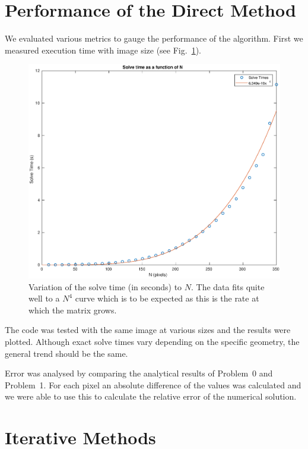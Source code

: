 \documentclass[a4paper]{article}
\begin{document}
\section{Performance of the Direct Method}
We evaluated various metrics to gauge the performance of the algorithm. First
we measured execution time with image size (see Fig.~\ref{sizetestFig}).
\begin{figure}
	\centering
	\includegraphics[scale=0.21]{sizebenchmark.eps}
	\caption{Variation of the solve time (in seconds) to $N$. The data fits
	quite well to a $N^4$ curve which is to be expected as this is the rate
	at which the matrix grows.}
	\label{sizetestFig}
\end{figure}
The code was tested with the same image at various sizes and the results were
plotted. Although exact solve times vary depending on the specific geometry,
the general trend should be the same.

Error was analysed by comparing the analytical results of Problem~0 and
Problem~1. For each pixel an absolute difference of the values was calculated
and we were able to use this to calculate the relative error of the numerical
solution.
        

\section{{\Large\textbf{Iterative Methods}}}
\end{document}
